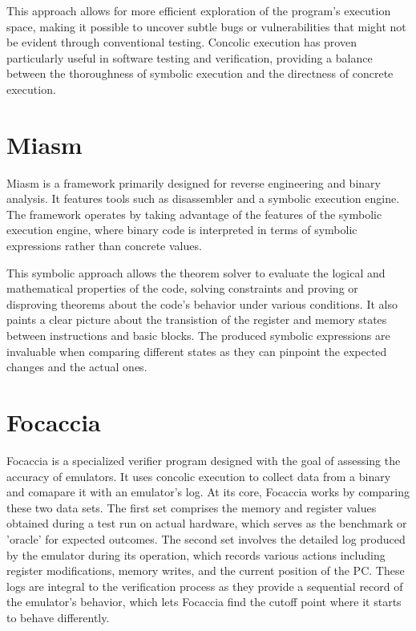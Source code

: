 This approach allows for more efficient exploration of the program's execution space, making it possible to uncover subtle bugs or vulnerabilities that might not be evident through conventional testing. 
Concolic execution has proven particularly useful in software testing and verification, providing a balance between the thoroughness of symbolic execution and the directness of concrete execution.

\section{Miasm}
Miasm \cite{miasm} is a framework primarily designed for reverse engineering and binary analysis.
It features tools such as disassembler and a symbolic execution engine.
The framework operates by taking advantage of the features of the symbolic execution engine, where binary code is interpreted in terms of symbolic expressions rather than concrete values.

This symbolic approach allows the theorem solver to evaluate the logical and mathematical properties of the code, solving constraints and proving or disproving theorems about the code's behavior under various conditions.
It also paints a clear picture about the transistion of the register and memory states between instructions and basic blocks.
The produced symbolic expressions are invaluable when comparing different states as they can pinpoint the expected changes and the actual ones.

\section{Focaccia}
Focaccia is a specialized verifier program designed with the goal of assessing the accuracy of emulators.
It uses concolic execution to collect data from a binary and comapare it with an emulator's log.
At its core, Focaccia works by comparing these two data sets.
The first set comprises the memory and register values obtained during a test run on actual hardware, which serves as the benchmark or 'oracle' for expected outcomes. 
The second set involves the detailed log produced by the emulator during its operation, which records various actions including register modifications, memory writes, and the current position of the \ac{PC}.
These logs are integral to the verification process as they provide a sequential record of the emulator's behavior, which lets Focaccia find the cutoff point where it starts to behave differently.

